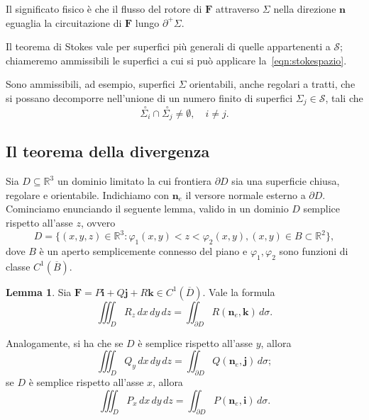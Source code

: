 \documentclass[a4paper]{book}
\numberwithin{equation}{section}
\renewcommand{\phi}{\varphi}
\theoremstyle{plain}
\theoremstyle{definition}
\newtheorem{lem}{Lemma}[section]
\theoremstyle{remark}
\renewcommand{\vec}{\boldsymbol}
\theoremstyle{example}
\begin{document}
		Il significato fisico è che il flusso del rotore di $\vec{F}$ attraverso $\Sigma$ nella direzione $\vec{n}$ eguaglia la circuitazione di $\vec{F}$ lungo $\partial^+ \Sigma$.

		Il teorema di Stokes vale per superfici più generali di quelle appartenenti a $\mathcal{S}$; chiameremo ammissibili le superfici a cui si può applicare la~\eqref{eqn:stokespazio}.

		Sono ammissibili, ad esempio, superfici $\Sigma$ orientabili, anche regolari a tratti, che si possano decomporre nell'unione di un numero finito di superfici $\Sigma_j \in \mathcal{S}$, tali che
			\begin{equation*}
				\overset{\circ}{\Sigma_i} \cap \overset{\circ}{\Sigma_j} \ne \emptyset, \quad i \ne j.
			\end{equation*}

\subsection{Il teorema della divergenza}
Sia $D \subseteq \mathbb{R}^3$ un dominio limitato la cui frontiera $\partial D$ sia una superficie chiusa, regolare e orientabile. Indichiamo con $\vec{n}_e$ il versore normale esterno a $\partial D$.
Cominciamo enunciando il seguente lemma, valido in un dominio $D$ semplice rispetto all'asse $z$, ovvero
	\begin{equation*}
		D = \{(x, y, z) \in \mathbb{R}^3 \colon \phi_1(x, y) < z < \phi_2(x, y), (x, y) \in B \subset \mathbb{R}^2\},
	\end{equation*}
dove $B$ è un aperto semplicemente connesso del piano e $\phi_1, \phi_2$ sono funzioni di classe $C^1(\overline{B})$.

\begin{lem}
	Sia $\vec{F} = P\vec{i} + Q\vec{j} + R\vec{k} \in C^1(\overline{D})$. Vale la formula
		\begin{equation}
			\iiint_D R_z \,dx\,dy\,dz = \iint_{\partial D}R(\vec{n}_e, \vec{k})\,d\sigma.
		\end{equation}
\end{lem}

Analogamente, si ha che se $D$ è semplice rispetto all'asse $y$, allora
	\begin{equation}
		\iiint_D Q_y \,dx \,dy\,dz = \iint_{\partial D}Q(\vec{n}_e, \vec{j}) \, d\sigma;
	\end{equation}
	se $D$ è semplice rispetto all'asse $x$, allora
		\begin{equation}
			\iiint_D P_x\,dx\,dy\,dz = \iint_{\partial D} P (\vec{n}_e, \vec{i})\, d\sigma.
		\end{equation}
\end{document}
